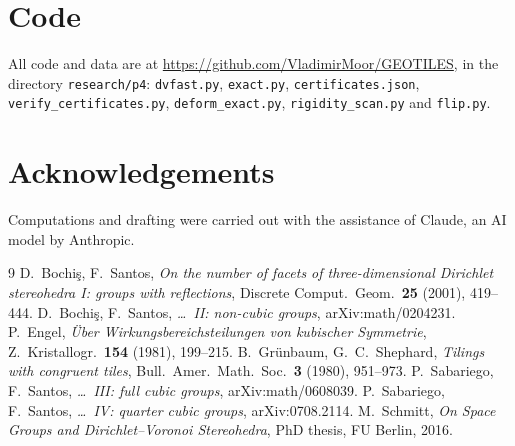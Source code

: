 \documentclass[11pt]{amsart}
\theoremstyle{definition}
\begin{document}
\section*{Code}
All code and data are at \url{https://github.com/VladimirMoor/GEOTILES}, in the directory \texttt{research/p4}:
\texttt{dvfast.py}, \texttt{exact.py}, \texttt{certificates.json}, \texttt{verify\_certificates.py},
\texttt{deform\_exact.py}, \texttt{rigidity\_scan.py} and \texttt{flip.py}.

\section*{Acknowledgements}
Computations and drafting were carried out with the assistance of Claude, an AI model by Anthropic.

\begin{thebibliography}{9}
 D.~Bochi\c{s}, F.~Santos, \emph{On the number of facets of three-dimensional Dirichlet stereohedra I:
groups with reflections}, Discrete Comput.\ Geom.\ \textbf{25} (2001), 419--444.
 D.~Bochi\c{s}, F.~Santos, \emph{\ldots\ II: non-cubic groups}, arXiv:math/0204231.
 P.~Engel, \emph{\"Uber Wirkungsbereichsteilungen von kubischer Symmetrie}, Z.\ Kristallogr.\ \textbf{154}
(1981), 199--215.
 B.~Gr\"unbaum, G.~C.~Shephard, \emph{Tilings with congruent tiles}, Bull.\ Amer.\ Math.\ Soc.\ \textbf{3}
(1980), 951--973.
 P.~Sabariego, F.~Santos, \emph{\ldots\ III: full cubic groups}, arXiv:math/0608039.
 P.~Sabariego, F.~Santos, \emph{\ldots\ IV: quarter cubic groups}, arXiv:0708.2114.
 M.~Schmitt, \emph{On Space Groups and Dirichlet--Voronoi Stereohedra}, PhD thesis, FU Berlin, 2016.
\end{thebibliography}
\end{document}
